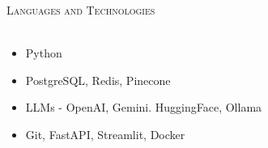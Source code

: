 \documentclass[a4paper]{article}
\newcommand{\lineunder} {
    \vspace*{-8pt} \\
    \hspace*{-18pt} \hrulefill \\
}
\newcommand{\header} [1] {
    {\hspace*{-18pt}\vspace*{6pt} \textsc{#1}}
    \vspace*{-6pt} \lineunder
}
\begin{document}


\header{Languages and Technologies}
\begin{itemize}
    \item Python
    \item PostgreSQL, Redis, Pinecone
    \item LLMs - OpenAI, Gemini. HuggingFace, Ollama
    \item Git, FastAPI, Streamlit, Docker
\end{itemize}

\vspace{2mm}

\
\end{document}
